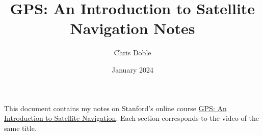 \documentclass{article}
\title{GPS: An Introduction to Satellite Navigation Notes}
\author{Chris Doble}
\date{January 2024}
\begin{document}
This document contains my notes on Stanford's online course \href{https://www.youtube.com/playlist?list=PLGvhNIiu1ubyEOJga50LJMzVXtbUq6CPo}{GPS: An Introduction to Satellite Navigation}. Each section corresponds to the video of the same title.

\tableofcontents
\end{document}
